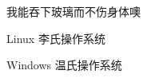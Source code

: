 % 
%
%
% 
%
\begin{denotation}

  \item[\xjtuthesis]    我能吞下玻璃而不伤身体噢
  \item[Linux]          李氏操作系统
  \item[Windows]        温氏操作系统

\end{denotation}
